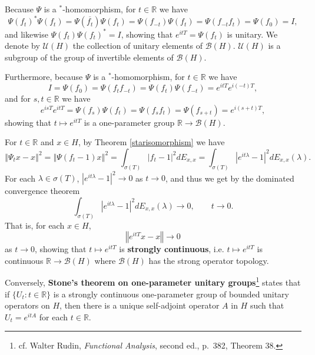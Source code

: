 \documentclass{article}
\newcommand{\norm}[1]{\left\Vert #1 \right\Vert}
\theoremstyle{definition}
\begin{document}
Because $\Psi$ is a $^*$-homomorphism, for $t \in \mathbb{R}$ we have
\[
\Psi(f_t)^* \Psi(f_t) = \Psi(\overline{f_t}) \Psi(f_t) = \Psi(f_{-t}) \Psi(f_t)
=\Psi(f_{-t} f_t) = \Psi(f_0)=I,
\] 
and likewise $\Psi(f_t) \Psi(f_t)^*=I$, showing that $e^{itT}=\Psi(f_t)$ is unitary. 
We denote by
$\mathscr{U}(H)$
the collection of unitary elements of $\mathscr{B}(H)$. $\mathscr{U}(H)$  is a subgroup of the group of invertible
elements of $\mathscr{B}(H)$.

 
Furthermore, because $\Psi$ is a $^*$-homomorphism, for $t \in \mathbb{R}$ we have
\[
I = \Psi(f_0) = \Psi(f_t f_{-t}) = \Psi(f_t) \Psi(f_{-t}) = e^{itT} e^{i(-t)T},
\] 
and for $s,t \in \mathbb{R}$ we have
\[
e^{isT} e^{itT} = \Psi(f_s) \Psi(f_t) = \Psi(f_s f_t) = \Psi(f_{s+t}) = e^{i(s+t)T},
\]
showing that $t \mapsto e^{itT}$ is a one-parameter group $\mathbb{R} \to \mathscr{B}(H)$. 
 
For $t \in \mathbb{R}$ and $x \in H$, by Theorem \ref{starisomorphism} we have
\[
\norm{\Psi_t x - x}^2 = \norm{\Psi(f_t-1)x}^2 = \int_{\sigma(T)} |f_t-1|^2 dE_{x,x}
=\int_{\sigma(T)} |e^{it\lambda}-1|^2 dE_{x,x}(\lambda).
\]
For each $\lambda \in \sigma(T)$, $|e^{it\lambda}-1|^2 \to 0$ as $t \to 0$, and thus we get
by the dominated convergence theorem 
\[
\int_{\sigma(T)} |e^{it\lambda}-1|^2 dE_{x,x}(\lambda) \to 0, \qquad t \to 0.
\]
That is, for each $x \in H$,
\[
\norm{e^{itT}x-x} \to 0
\]
as $t \to 0$, showing that $t \mapsto e^{itT}$ is \textbf{strongly continuous}, i.e. $t \mapsto e^{itT}$ is continuous
$\mathbb{R} \to \mathscr{B}(H)$ where $\mathscr{B}(H)$ has the strong operator topology.

Conversely, \textbf{Stone's theorem on one-parameter unitary groups}\footnote{cf. Walter Rudin, {\em Functional Analysis}, second ed., p.~382, Theorem 38.}
 states that if $\{U_t: t \in \mathbb{R}\}$ is a strongly continuous one-parameter group of
bounded unitary operators on $H$, then there is a unique self-adjoint operator $A$ in $H$ such that $U_t = e^{itA}$ for each $t \in \mathbb{R}$.
\end{document}
